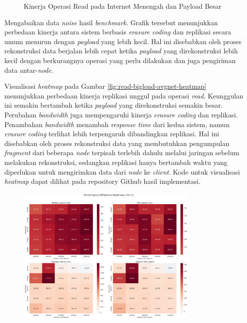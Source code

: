 \begin{enumerate}
\begin{figure}[ht]
    \caption{Kinerja Operasi Read pada Internet Menengah dan Payload Besar}
      \label{fig:read-bigload-avgnet}
  \end{figure}

  Mengabaikan data \textit{noise} hasil \textit{benchmark}. Grafik tersebut menunjukkan perbedaan kinerja antara sistem berbasis \textit{erasure coding} dan replikasi secara umum menurun dengan \textit{payload} yang lebih kecil. Hal ini disebabkan oleh proses rekonstruksi data berjalan lebih cepat ketika \textit{payload} yang direkonstruksi lebih kecil dengan berkurangnya operasi yang perlu dilakukan dan juga pengiriman data antar-\textit{node}.

  Visualisasi \textit{heatmap} pada Gambar \ref{fig:read-bigload-avgnet-heatmap} menunjukkan perbedaan kinerja replikasi unggul pada operasi \textit{read}. Keunggulan ini semakin bertambah ketika \textit{payload} yang direkonstruksi semakin besar. Perubahan \textit{bandwidth} juga mempengaruhi kinerja \textit{erasure coding} dan replikasi. Penambahan \textit{bandwidth} menambah \textit{response time} dari kedua sistem, namun \textit{erasure coding} terlihat lebih terpengaruh dibandingkan replikasi. Hal ini disebabkan oleh proses rekonstruksi data yang membutuhkan pengumpulan \textit{fragment} dari beberapa \textit{node} terpisah terlebih dahulu melalui jaringan sebelum melakukan rekonstruksi, sedangkan replikasi hanya bertambah waktu yang diperlukan untuk mengirimkan data dari \textit{node} ke \textit{client}. Kode untuk visualisasi \textit{heatmap} dapat dilihat pada repository Github hasil implementasi.

  \begin{figure}[ht]
    \centering
    \includegraphics[width=0.8\textwidth]{resources/chapter-4/read_bigload_avgnet_heatmap.png}


\end{figure}
\end{enumerate}
